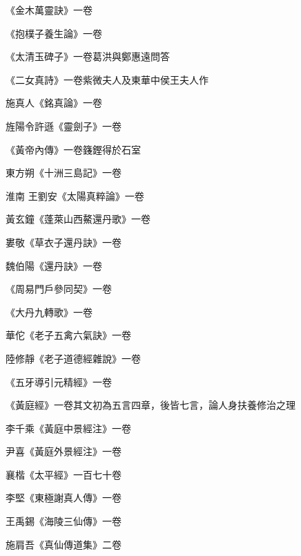 \begin{pinyinscope}
 《金木萬靈訣》一卷



 《抱樸子養生論》一卷



 《太清玉碑子》一卷葛洪與鄭惠遠問答



 《二女真詩》一卷紫微夫人及東華中侯王夫人作



 施真人《銘真論》一卷



 旌陽令許遜《靈劍子》一卷



 《黃帝內傳》一卷籛鏗得於石室



 東方朔《十洲三島記》一卷



 淮南
 王劉安《太陽真粹論》一卷



 黃玄鐘《蓬萊山西鰲還丹歌》一卷



 婁敬《草衣子還丹訣》一卷



 魏伯陽《還丹訣》一卷



 《周易門戶參同契》一卷



 《大丹九轉歌》一卷



 華佗《老子五禽六氣訣》一卷



 陸修靜《老子道德經雜說》一卷



 《五牙導引元精經》一卷



 《黃庭經》一卷其文初為五言四章，後皆七言，論人身扶養修治之理



 李千乘《黃庭中景經注》一卷



 尹喜《黃庭外景經注》一卷



 襄楷《太平經》一百七十卷



 李堅《東極謝真人傳》一卷



 王禹錫《海陵三仙傳》一卷



 施肩吾《真仙傳道集》二卷




\end{pinyinscope}
